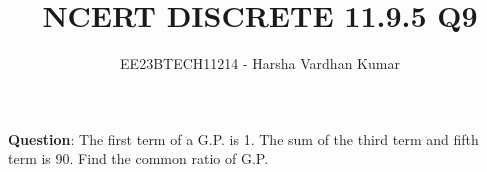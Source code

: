 \documentclass[journal,12pt,twocolumn]{IEEEtran}
\title{NCERT DISCRETE 11.9.5 Q9}
\author{EE23BTECH11214 - Harsha Vardhan Kumar}
\begin{document}
\maketitle
\textbf{Question}:
 The first term of a G.P. is 1. The sum of the third term and fifth
term is 90. Find the common ratio of G.P.
\end{document}
